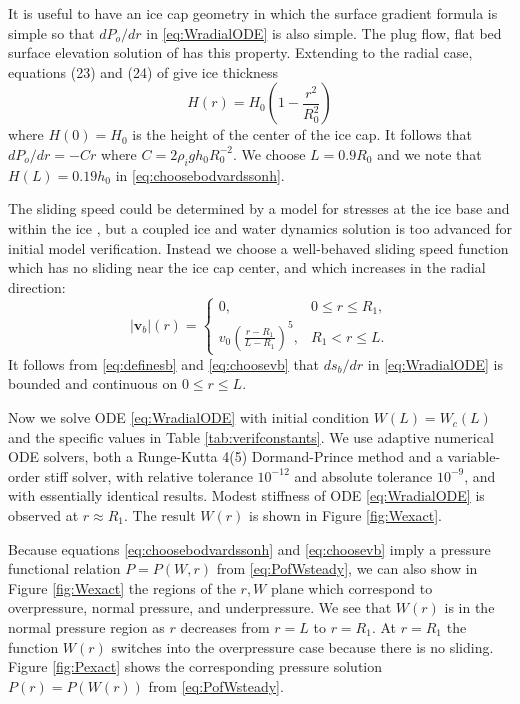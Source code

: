 \documentclass[11pt,final]{amsart}
\newcommand\bv{\mathbf{v}}
\begin{document}
It is useful to have an ice cap geometry in which the surface gradient formula is simple so that $dP_o/dr$ in \eqref{eq:WradialODE} is also simple.  The plug flow, flat bed surface elevation solution of \cite{Bodvardsson} has this property.  Extending to the radial case, equations (23) and (24) of \citep{Bodvardsson} give ice thickness
\begin{equation}
H(r) = H_0 \left(1 - \frac{r^2}{R_0^2} \right) \label{eq:choosebodvardssonh}
\end{equation}
where $H(0)=H_0$ is the height of the center of the ice cap.  It follows that $dP_o/dr = - C r$ where $C=2\rho_i g h_0 R_0^{-2}$.  We choose $L=0.9 R_0$ and we note that $H(L)=0.19 h_0$ in \eqref{eq:choosebodvardssonh}.

The sliding speed could be determined by a model for stresses at the ice base and within the ice \citep{GreveBlatter2009}, but a coupled ice and water dynamics solution is too advanced for initial model verification.  Instead we choose a well-behaved sliding speed function which has no sliding near the ice cap center, and which increases in the radial direction:
\begin{equation}
|\bv_b|(r) = \begin{cases} 0, & 0 \le r \le R_1, \\
                           v_0  \left(\frac{r-R_1}{L-R_1}\right)^5, & R_1 < r \le L.
             \end{cases}  \label{eq:choosevb}
\end{equation}
It follows from \eqref{eq:definesb} and \eqref{eq:choosevb} that $ds_b/dr$ in \eqref{eq:WradialODE} is bounded and continuous on $0\le r \le L$.

Now we solve ODE \eqref{eq:WradialODE} with initial condition $W(L)=W_c(L)$ and the specific values in Table \ref{tab:verifconstants}.  We use adaptive numerical ODE solvers, both a Runge-Kutta 4(5) Dormand-Prince method and a variable-order stiff solver, with relative tolerance $10^{-12}$ and absolute tolerance $10^{-9}$, and with essentially identical results.  Modest stiffness \citep{AscherPetzold} of ODE \eqref{eq:WradialODE} is observed at $r\approx R_1$.  The result $W(r)$ is shown in Figure \ref{fig:Wexact}.

Because equations \eqref{eq:choosebodvardssonh} and \eqref{eq:choosevb} imply a pressure functional relation $P=P(W,r)$ from \eqref{eq:PofWsteady}, we can also show in Figure \ref{fig:Wexact} the regions of the $r,W$ plane which correspond to overpressure, normal pressure, and underpressure.  We see that $W(r)$ is in the normal pressure region as $r$ decreases from $r=L$ to $r=R_1$.  At $r=R_1$ the function $W(r)$ switches into the overpressure case because there is no sliding.  Figure \ref{fig:Pexact} shows the corresponding pressure solution $P(r)=P(W(r))$ from \eqref{eq:PofWsteady}.
\end{document}

